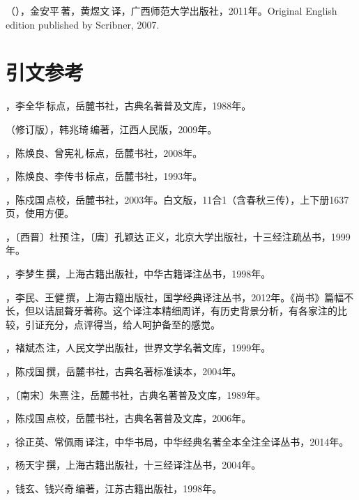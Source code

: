 （），金安平\,著，黄煜文\,译，广西师范大学出版社，2011年。Original English edition published by Scribner, 2007.



\lypdfbookmark\section*{引文参考}

，李全华\,标点，岳麓书社，古典名著普及文库，1988年。

（修订版），韩兆琦\,编著，江西人民版，2009年。

，陈焕良、曾宪礼\,标点，岳麓书社，2008年。

，陈焕良、李传书\,标点，岳麓书社，1993年。

，陈戍国\,点校，岳麓书社，2003年。白文版，11合1（含春秋三传），上下册1637页，使用方便。

，〔西晋〕杜预\,注，〔唐〕孔颖达\,正义，北京大学出版社，十三经注疏丛书，1999年。

，李梦生\,撰，上海古籍出版社，中华古籍译注丛书，1998年。

，李民、王健\,撰，上海古籍出版社，国学经典译注丛书，2012年。《尚书》篇幅不长，但以诘屈聱牙著称。这个译注本精细周详，有历史背景分析，有各家注的比较，引证充分，点评得当，给人呵护备至的感觉。

，褚斌杰\,注，人民文学出版社，世界文学名著文库，1999年。

，陈戍国\,撰，岳麓书社，古典名著标准读本，2004年。

，〔南宋〕朱熹\,注，岳麓书社，古典名著普及文库，1989年。

，陈戍国\,点校，岳麓书社，古典名著普及文库，2006年。

，徐正英、常佩雨\,译注，中华书局，中华经典名著全本全注全译丛书，2014年。

，杨天宇\,撰，上海古籍出版社，十三经译注丛书，2004年。

，钱玄、钱兴奇\,编著，江苏古籍出版社，1998年。

